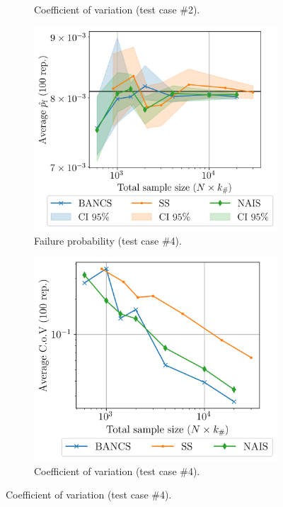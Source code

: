 \begin{figure}
\begin{subfigure}[b]{0.47\linewidth}
        \caption{Coefficient of variation (test case \#2).}
    \end{subfigure}
    \begin{subfigure}[b]{0.49\linewidth}
        \centering
        \includegraphics[width=\linewidth]{part3/figures/BANCS/RP38_mean.png}
        \caption{Failure probability (test case \#4).}
    \end{subfigure}
    \begin{subfigure}[b]{0.47\linewidth}
        \centering
        \includegraphics[width=\linewidth]{part3/figures/BANCS/RP38_cov.png}
        \caption{Coefficient of variation (test case \#4).}
    \end{subfigure}


\end{figure}
